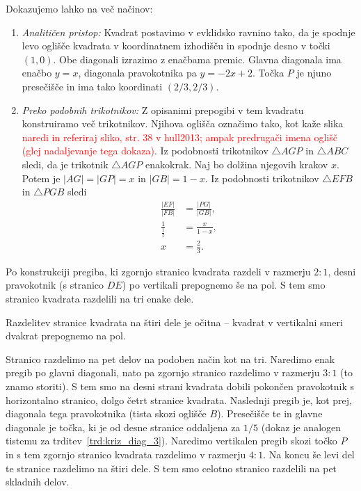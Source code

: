 \begin{dokaz}
    Dokazujemo lahko na več načinov:
    \begin{enumerate}
        \item \textit{Analitičen pristop:} Kvadrat postavimo v evklidsko ravnino tako, da je spodnje levo oglišče kvadrata v koordinatnem izhodišču in spodnje desno v točki $(1, 0)$. Obe diagonali izrazimo z enačbama premic. Glavna diagonala ima enačbo $y = x$, diagonala pravokotnika pa $y = -2x + 2$. Točka $P$ je njuno presečišče in ima tako koordinati $(2/3, 2/3)$.
        \item \textit{Preko podobnih trikotnikov:} Z opisanimi prepogibi v tem kvadratu konstruiramo več trikotnikov. Njihova oglišča označimo tako, kot kaže slika \textcolor{red}{naredi in referiraj sliko, str. 38 v hull2013; ampak predrugači imena oglišč (glej nadaljevanje tega dokaza)}. Iz podobnosti trikotnikov $\triangle AGP$ in $\triangle ABC$ sledi, da je trikotnik $\triangle AGP$ enakokrak. Naj bo dolžina njegovih krakov $x$. Potem je $|AG| = |GP| = x$ in $|GB| = 1 - x$. Iz podobnosti trikotnikov $\triangle EFB$ in $\triangle PGB$ sledi
        \begin{align*}
            \frac{|EF|}{|FB|} &= \frac{|PG|}{|GB|}, \\
            \frac{1}{\frac{1}{2}} &= \frac{x}{1 - x}, \\
            x &= \frac{2}{3}.
        \end{align*}
    \end{enumerate}
\end{dokaz}

Po konstrukciji pregiba, ki zgornjo stranico kvadrata razdeli v razmerju $2:1$, desni pravokotnik (s stranico $DE$) po vertikali prepognemo še na pol. S tem smo stranico kvadrata razdelili na tri enake dele.

Razdelitev stranice kvadrata na štiri dele je očitna -- kvadrat v vertikalni smeri dvakrat prepognemo na pol.

Stranico razdelimo na pet delov na podoben način kot na tri. Naredimo enak pregib po glavni diagonali, nato pa zgornjo stranico razdelimo v razmerju $3:1$ (to znamo storiti). S tem smo na desni strani kvadrata dobili pokončen pravokotnik s horizontalno stranico, dolgo četrt stranice kvadrata. Naslednji pregib je, kot prej, diagonala tega pravokotnika (tista skozi oglišče $B$). Presečišče te in glavne diagonale je točka, ki je od desne stranice oddaljena za $1/5$ (dokaz je analogen tistemu za trditev~\ref{trd:kriz_diag_3}). Naredimo vertikalen pregib skozi točko $P$ in s tem zgornjo stranico kvadrata razdelimo v razmerju $4:1$. Na koncu še levi del te stranice razdelimo na štiri dele. S tem smo celotno stranico razdelili na pet skladnih delov.

